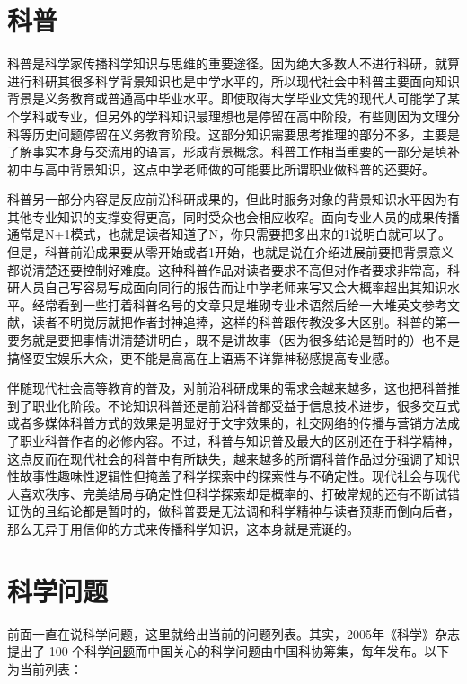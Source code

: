 \documentclass[]{tufte-book}
\begin{document}
\hypertarget{ux79d1ux666e}{%
\section{科普}\label{ux79d1ux666e}}

科普是科学家传播科学知识与思维的重要途径。因为绝大多数人不进行科研，就算进行科研其很多科学背景知识也是中学水平的，所以现代社会中科普主要面向知识背景是义务教育或普通高中毕业水平。即使取得大学毕业文凭的现代人可能学了某个学科或专业，但另外的学科知识最理想也是停留在高中阶段，有些则因为文理分科等历史问题停留在义务教育阶段。这部分知识需要思考推理的部分不多，主要是了解事实本身与交流用的语言，形成背景概念。科普工作相当重要的一部分是填补初中与高中背景知识，这点中学老师做的可能要比所谓职业做科普的还要好。

科普另一部分内容是反应前沿科研成果的，但此时服务对象的背景知识水平因为有其他专业知识的支撑变得更高，同时受众也会相应收窄。面向专业人员的成果传播通常是N+1模式，也就是读者知道了N，你只需要把多出来的1说明白就可以了。但是，科普前沿成果要从零开始或者1开始，也就是说在介绍进展前要把背景意义都说清楚还要控制好难度。这种科普作品对读者要求不高但对作者要求非常高，科研人员自己写容易写成面向同行的报告而让中学老师来写又会大概率超出其知识水平。经常看到一些打着科普名号的文章只是堆砌专业术语然后给一大堆英文参考文献，读者不明觉厉就把作者封神追捧，这样的科普跟传教没多大区别。科普的第一要务就是要把事情讲清楚讲明白，既不是讲故事（因为很多结论是暂时的）也不是搞怪耍宝娱乐大众，更不能是高高在上语焉不详靠神秘感提高专业感。

伴随现代社会高等教育的普及，对前沿科研成果的需求会越来越多，这也把科普推到了职业化阶段。不论知识科普还是前沿科普都受益于信息技术进步，很多交互式或者多媒体科普方式的效果是明显好于文字效果的，社交网络的传播与营销方法成了职业科普作者的必修内容。不过，科普与知识普及最大的区别还在于科学精神，这点反而在现代社会的科普中有所缺失，越来越多的所谓科普作品过分强调了知识性故事性趣味性逻辑性但掩盖了科学探索中的探索性与不确定性。现代社会与现代人喜欢秩序、完美结局与确定性但科学探索却是概率的、打破常规的还有不断试错证伪的且结论都是暂时的，做科普要是无法调和科学精神与读者预期而倒向后者，那么无异于用信仰的方式来传播科学知识，这本身就是荒诞的。

\hypertarget{ux79d1ux5b66ux95eeux9898}{%
\section{科学问题}\label{ux79d1ux5b66ux95eeux9898}}

前面一直在说科学问题，这里就给出当前的问题列表。其实，2005年《科学》杂志提出了 100 个科学\href{https://science.sciencemag.org/content/309/5731/78.2}{问题}而中国关心的科学问题由中国科协筹集，每年发布。以下为当前列表：
\end{document}

